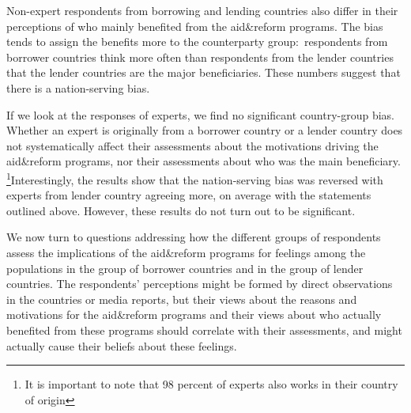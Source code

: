 Non-expert respondents from borrowing and lending countries also differ in
their perceptions of who mainly benefited from the aid\&reform programs. The
bias tends to assign the benefits more to the counterparty group:\
respondents from borrower countries think more often than respondents from
the lender countries that the lender countries are the major beneficiaries. These numbers
suggest that there is a nation-serving bias. 

If we look at the responses of experts, we find no significant country-group
bias. Whether an expert is originally from a borrower country or a lender
country does not systematically affect their assessments about the
motivations driving the aid\&reform programs, nor their assessments about
who was the main beneficiary. \footnote{It is important to note that 98 percent of experts also works in their country of origin }Interestingly, the results show that the
nation-serving bias was reversed with experts from lender country agreeing more, on
average with the statements outlined above. However, these results do not turn out to be significant.

We now turn to questions addressing how the different groups of respondents
assess the implications of the aid\&reform programs for feelings among the
populations in the group of borrower countries and in the group of lender
countries. The respondents' perceptions might be formed by direct
observations in the countries or media reports, but their views about the
reasons and motivations for the aid\&reform programs and their views about
who actually benefited from these programs should correlate with their
assessments, and might actually cause their beliefs about these feelings. 

